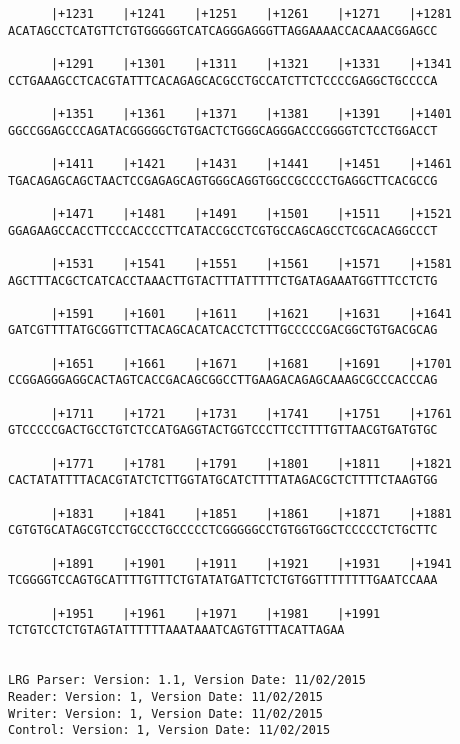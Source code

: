 \documentclass{article}
\begin{document}
\begin{Verbatim}
      |+1231    |+1241    |+1251    |+1261    |+1271    |+1281
ACATAGCCTCATGTTCTGTGGGGGTCATCAGGGAGGGTTAGGAAAACCACAAACGGAGCC
                                                            
      |+1291    |+1301    |+1311    |+1321    |+1331    |+1341
CCTGAAAGCCTCACGTATTTCACAGAGCACGCCTGCCATCTTCTCCCCGAGGCTGCCCCA
                                                            
      |+1351    |+1361    |+1371    |+1381    |+1391    |+1401
GGCCGGAGCCCAGATACGGGGGCTGTGACTCTGGGCAGGGACCCGGGGTCTCCTGGACCT
                                                            
      |+1411    |+1421    |+1431    |+1441    |+1451    |+1461
TGACAGAGCAGCTAACTCCGAGAGCAGTGGGCAGGTGGCCGCCCCTGAGGCTTCACGCCG
                                                            
      |+1471    |+1481    |+1491    |+1501    |+1511    |+1521
GGAGAAGCCACCTTCCCACCCCTTCATACCGCCTCGTGCCAGCAGCCTCGCACAGGCCCT
                                                            
      |+1531    |+1541    |+1551    |+1561    |+1571    |+1581
AGCTTTACGCTCATCACCTAAACTTGTACTTTATTTTTCTGATAGAAATGGTTTCCTCTG
                                                            
      |+1591    |+1601    |+1611    |+1621    |+1631    |+1641
GATCGTTTTATGCGGTTCTTACAGCACATCACCTCTTTGCCCCCGACGGCTGTGACGCAG
                                                            
      |+1651    |+1661    |+1671    |+1681    |+1691    |+1701
CCGGAGGGAGGCACTAGTCACCGACAGCGGCCTTGAAGACAGAGCAAAGCGCCCACCCAG
                                                            
      |+1711    |+1721    |+1731    |+1741    |+1751    |+1761
GTCCCCCGACTGCCTGTCTCCATGAGGTACTGGTCCCTTCCTTTTGTTAACGTGATGTGC
                                                            
      |+1771    |+1781    |+1791    |+1801    |+1811    |+1821
CACTATATTTTACACGTATCTCTTGGTATGCATCTTTTATAGACGCTCTTTTCTAAGTGG
                                                            
      |+1831    |+1841    |+1851    |+1861    |+1871    |+1881
CGTGTGCATAGCGTCCTGCCCTGCCCCCTCGGGGGCCTGTGGTGGCTCCCCCTCTGCTTC
                                                            
      |+1891    |+1901    |+1911    |+1921    |+1931    |+1941
TCGGGGTCCAGTGCATTTTGTTTCTGTATATGATTCTCTGTGGTTTTTTTTGAATCCAAA
                                                            
      |+1951    |+1961    |+1971    |+1981    |+1991
TCTGTCCTCTGTAGTATTTTTTAAATAAATCAGTGTTTACATTAGAA

                                               
LRG Parser: Version: 1.1, Version Date: 11/02/2015
Reader: Version: 1, Version Date: 11/02/2015
Writer: Version: 1, Version Date: 11/02/2015
Control: Version: 1, Version Date: 11/02/2015
\end{Verbatim}
\end{document}
